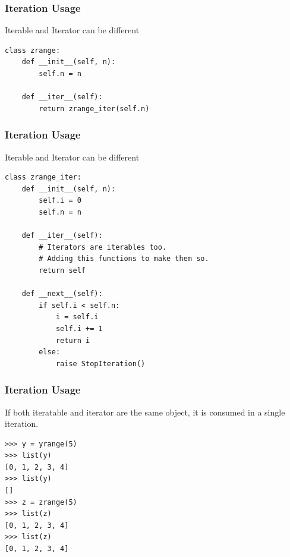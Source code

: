 \begin{frame}[fragile]\frametitle{Iteration Usage}
Iterable and Iterator can be different
\begin{lstlisting}
class zrange:
    def __init__(self, n):
        self.n = n

    def __iter__(self):
        return zrange_iter(self.n)

\end{lstlisting}
\end{frame}

\begin{frame}[fragile]\frametitle{Iteration Usage}
Iterable and Iterator can be different
\begin{lstlisting}
class zrange_iter:
    def __init__(self, n):
        self.i = 0
        self.n = n

    def __iter__(self):
        # Iterators are iterables too.
        # Adding this functions to make them so.
        return self

    def __next__(self):
        if self.i < self.n:
            i = self.i
            self.i += 1
            return i
        else:
            raise StopIteration()
\end{lstlisting}
\end{frame}


\begin{frame}[fragile]\frametitle{Iteration Usage}
If both iteratable and iterator are the same object, it is consumed in a single iteration.
\begin{lstlisting}
>>> y = yrange(5)
>>> list(y)
[0, 1, 2, 3, 4]
>>> list(y)
[]
>>> z = zrange(5)
>>> list(z)
[0, 1, 2, 3, 4]
>>> list(z)
[0, 1, 2, 3, 4]
\end{lstlisting}
\end{frame}



